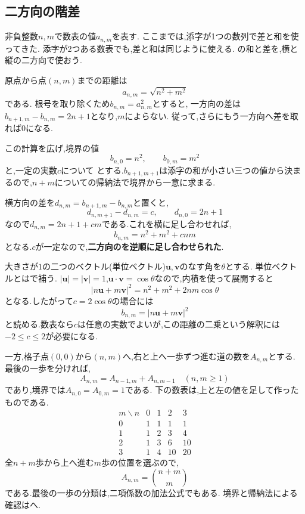\subsection{二方向の階差}\label{節：二方向の階差}
非負整数$n,m$で数表の値$a_{n,m}$を表す.
ここまでは,添字が1つの数列で差と和を使ってきた.
添字が2つある数表でも,差と和は同じように使える.
の和と差を,横と縦の二方向で使おう.

原点から点$(n,m)$までの距離は
\[ a_{n,m}=\sqrt{n^2+m^2} \]
である.
根号を取り除くため$b_{n,m}=a_{n,m}^2$とすると,
一方向の差は$b_{n+1,m}-b_{n,m}=2n+1$となり,$m$によらない.
従って,さらにもう一方向へ差を取れば0になる.

この計算を広げ,境界の値
\[
  b_{n,0}=n^2,\qquad b_{0,m}=m^2
\]
と,一定の実数$c$について
\BookMathLayout{\[
    b_{n+1,m+1}-b_{n+1,m}-b_{n,m+1}+b_{n,m}=c
  \]}{\[
    \begin{aligned}
      b_{n+1,m+1}-b_{n+1,m}\\
      {}-b_{n,m+1}+b_{n,m}=c
    \end{aligned}
  \]}
とする.$b_{n+1,m+1}$は添字の和が小さい三つの値から決まるので,$n+m$についての帰納法で境界から一意に求まる.

横方向の差を$d_{n,m}=b_{n+1,m}-b_{n,m}$と置くと,
\[
  d_{n,m+1}-d_{n,m}=c,\qquad d_{n,0}=2n+1
\]
なので$d_{n,m}=2n+1+cm$である.これを横に足し合わせれば,
\[
  b_{n,m}=n^2+m^2+cnm
\]
となる.$c$が一定なので,\textbf{二方向のを逆順に足し合わせられた}.

大きさが$1$の二つのベクトル(単位ベクトル)$\boldsymbol u,\boldsymbol v$のなす角を$\theta$とする.
単位ベクトルとはで補う.
$|\boldsymbol u|=|\boldsymbol v|=1$,$\boldsymbol u\cdot\boldsymbol v=\cos\theta$なので,内積を使って展開すると
\[
  |n\boldsymbol u+m\boldsymbol v|^2=n^2+m^2+2nm\cos\theta
\]
となる.したがって$c=2\cos\theta$の場合には
\[
  b_{n,m}=|n\boldsymbol u+m\boldsymbol v|^2
\]
と読める.数表なら$c$は任意の実数でよいが,この距離の二乗という解釈には$-2\le c\le2$が必要になる.

一方,格子点$(0,0)$から$(n,m)$へ,右と上へ一歩ずつ進む道の数を$A_{n,m}$とする.
最後の一歩を分ければ,
\[
  A_{n,m}=A_{n-1,m}+A_{n,m-1}\quad(n,m\ge1)
\]
であり,境界では$A_{n,0}=A_{0,m}=1$である.
\BookFigLatticeRecurrence
下の数表は,上と左の値を足して作ったものである.
\[
  \begin{array}{c|rrrr}
    m\backslash n&0&1&2&3\\\hline
    0&1&1&1&1\\
    1&1&2&3&4\\
    2&1&3&6&10\\
    3&1&4&10&20
  \end{array}
\]
全$n+m$歩から上へ進む$m$歩の位置を選ぶので,
\[
  A_{n,m}=\binom{n+m}{m}
\]
である.最後の一歩の分類は,二項係数の加法公式でもある.
境界と帰納法による確認はへ.

